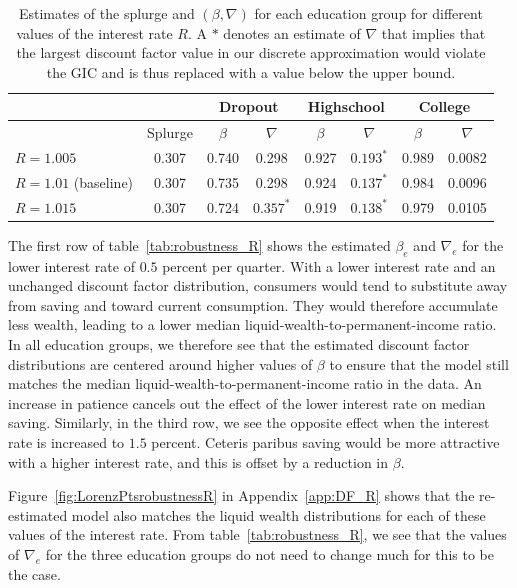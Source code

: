 \documentclass[\econtexRoot/HAFiscal]{subfiles}
\begin{document}
\begin{table}[t]
	\begin{center}
		\begin{tabular}{lc|cccccc} 
			\toprule
			& & \multicolumn{2}{c}{Dropout} & \multicolumn{2}{c}{Highschool} & \multicolumn{2}{c}{College} \\ \midrule 
			& Splurge & $\beta$ & $\nabla$ & $\beta$ & $\nabla$ & $\beta$ & $\nabla$ \\ \midrule 
			$R = 1.005$ & 0.307 & 0.740 & 0.298 & 0.927 & $0.193^{*}$ & 0.989 & 0.0082 \\
			$R = 1.01$ (baseline) & 0.307 & 0.735 & 0.298 & 0.924 & $0.137^{*}$ & 0.984 & 0.0096 \\ 
			$R = 1.015$ & 0.307 & 0.724 & $0.357^{*}$ & 0.919 & $0.138^{*}$ & 0.979 & 0.0105 
			\\ \bottomrule 
		\end{tabular}
		\caption{Estimates of the splurge and $(\beta,\nabla)$ for each education group for different values of the interest rate $R$.
A $*$ denotes an estimate of $\nabla$ that implies that the largest discount factor value in our discrete approximation would violate the GIC and is thus replaced with a value below the upper bound.}
		\notinsubfile{\label{tab:robustness_R}}
	\end{center}
\end{table}

The first row of table~\ref{tab:robustness_R} shows the estimated $\beta_e$ and $\nabla_e$ for the lower interest rate of $0.5$ percent per quarter.
With a lower interest rate and an unchanged discount factor distribution, consumers would tend to substitute away from saving and toward current consumption.
They would therefore accumulate less wealth, leading to a lower median liquid-wealth-to-permanent-income ratio.
In all education groups, we therefore see that the estimated discount factor distributions are centered around higher values of $\beta$ to ensure that the model still matches the median liquid-wealth-to-permanent-income ratio in the data.
An increase in patience cancels out the effect of the lower interest rate on median saving.
Similarly, in the third row, we see the opposite effect when the interest rate is increased to $1.5$ percent.
Ceteris paribus saving would be more attractive with a higher interest rate, and this is offset by a reduction in $\beta$.


Figure~\ref{fig:LorenzPtsrobustnessR} in Appendix~\ref{app:DF_R} shows that the re-estimated model also matches the liquid wealth distributions for each of these values of the interest rate.
From table~\ref{tab:robustness_R}, we see that the values of $\nabla_e$ for the three education groups do not need to change much for this to be the case.
\end{document}
